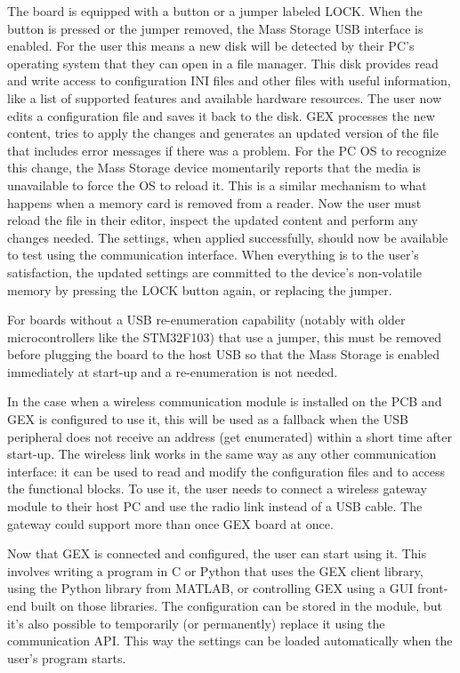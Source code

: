 The board is equipped with a button or a jumper labeled LOCK. When the button is pressed or the jumper removed, the Mass Storage USB interface is enabled. For the user this means a new disk will be detected by their PC's operating system that they can open in a file manager. This disk provides read and write access to configuration INI files and other files with useful information, like a list of supported features and available hardware resources. The user now edits a configuration file and saves it back to the disk. GEX processes the new content, tries to apply the changes and generates an updated version of the file that includes error messages if there was a problem. For the PC OS to recognize this change, the Mass Storage device momentarily reports that the media is unavailable to force the OS to reload it. This is a similar mechanism to what happens when a memory card is removed from a reader. Now the user must reload the file in their editor, inspect the updated content and perform any changes needed. The settings, when applied successfully, should now be available to test using the communication interface. When everything is to the user's satisfaction, the updated settings are committed to the device's non-volatile memory by pressing the LOCK button again, or replacing the jumper. 

For boards without a USB re-enumeration capability (notably with older microcontrollers like the STM32F103) that use a jumper, this must be removed before plugging the board to the host USB so that the Mass Storage is enabled immediately at start-up and a re-enumeration is not needed.

In the case when a wireless communication module is installed on the PCB and GEX is configured to use it, this will be used as a fallback when the USB peripheral does not receive an address (get enumerated) within a short time after start-up. The wireless link works in the same way as any other communication interface: it can be used to read and modify the configuration files and to access the functional blocks. To use it, the user needs to connect a wireless gateway module to their host PC and use the radio link instead of a USB cable. The gateway could support more than once GEX board at once.

Now that GEX is connected and configured, the user can start using it. This involves writing a program in C or Python that uses the GEX client library, using the Python library from MATLAB, or controlling GEX using a GUI front-end built on those libraries. The configuration can be stored in the module, but it's also possible to temporarily (or permanently) replace it using the communication API. This way the settings can be loaded automatically when the user's program starts.


